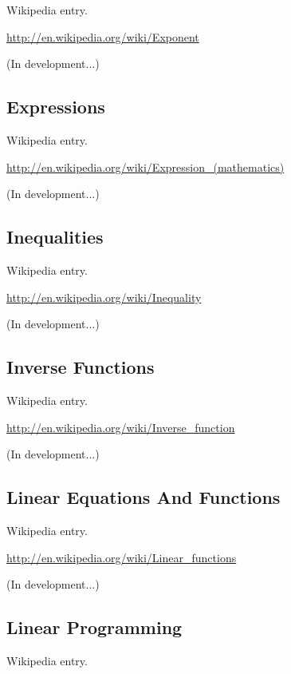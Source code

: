 \documentclass[12pt,twoside]{book}
\begin{document}
Wikipedia entry.

\href{http://en.wikipedia.org/wiki/Exponent}{http://en.wikipedia.org/wiki/Exponent}

(In development...)

\subsection[Expressions]{Expressions}

Wikipedia entry.

\href{http://en.wikipedia.org/wiki/Expression_(mathematics)}{http://en.wikipedia.org/wiki/Expression\_(mathematics)}

(In development...)

\subsection[Inequalities]{Inequalities}

Wikipedia entry.

\href{http://en.wikipedia.org/wiki/Inequality}{http://en.wikipedia.org/wiki/Inequality}

(In development...)

\subsection[Inverse Functions]{Inverse Functions}

Wikipedia entry.

\href{http://en.wikipedia.org/wiki/Inverse_function}{http://en.wikipedia.org/wiki/Inverse\_function}

(In development...)

\subsection[Linear Equations And Functions]{Linear Equations And Functions}

Wikipedia entry.

\href{http://en.wikipedia.org/wiki/Linear_functions}{http://en.wikipedia.org/wiki/Linear\_functions}

(In development...)

\subsection[Linear Programming]{Linear Programming}

Wikipedia entry.
\end{document}

